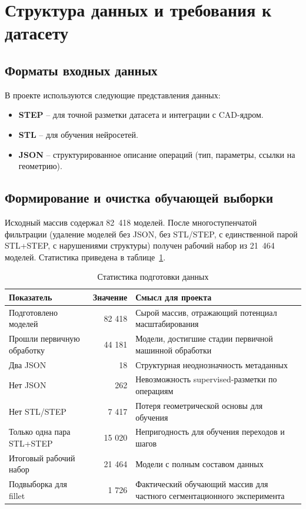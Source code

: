 \section{Структура данных и требования к датасету}

\subsection{Форматы входных данных}
В проекте используются следующие представления данных:
\begin{itemize}
    \item \textbf{STEP} – для точной разметки датасета и интеграции с CAD-ядром.
    \item \textbf{STL} – для обучения нейросетей.
    \item \textbf{JSON} – структурированное описание операций (тип, параметры, ссылки на геометрию).
\end{itemize}

\subsection{Формирование и очистка обучающей выборки}
Исходный массив содержал 82~418 моделей. После многоступенчатой фильтрации (удаление моделей без JSON, без STL/STEP, с единственной парой STL+STEP, с нарушениями структуры) получен рабочий набор из 21~464 моделей. Статистика приведена в таблице~\ref{tab:data-stats}.

\begin{table}[h]
\centering
\caption{Статистика подготовки данных}
\label{tab:data-stats}
\begin{tabular}{|l|r|p{6cm}|}
\hline
\textbf{Показатель} & \textbf{Значение} & \textbf{Смысл для проекта} \\
\hline
Подготовлено моделей & 82 418 & Сырой массив, отражающий потенциал масштабирования \\
\hline
Прошли первичную обработку & 44 181 & Модели, достигшие стадии первичной машинной обработки \\
\hline
Два JSON & 18 & Структурная неоднозначность метаданных \\
\hline
Нет JSON & 262 & Невозможность supervised-разметки по операциям \\
\hline
Нет STL/STEP & 7 417 & Потеря геометрической основы для обучения \\
\hline
Только одна пара STL+STEP & 15 020 & Непригодность для обучения переходов и шагов \\
\hline
Итоговый рабочий набор & 21 464 & Модели с полным составом данных \\
\hline
Подвыборка для fillet & 1 726 & Фактический обучающий массив для частного сегментационного эксперимента \\
\hline
\end{tabular}
\end{table}

